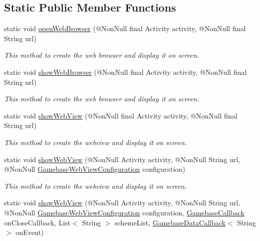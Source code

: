 \subsection*{Static Public Member Functions}
\begin{DoxyCompactItemize}
\item 
static void \hyperlink{classcom_1_1toast_1_1android_1_1gamebase_1_1_gamebase_1_1_web_view_a85a45ba53807b31382812cc72143122f}{open\+Web\+Browser} (@Non\+Null final Activity activity, @Non\+Null final String url)
\begin{DoxyCompactList}\small\item\em This method to create the web browser and display it on screen. \end{DoxyCompactList}\item 
static void \hyperlink{classcom_1_1toast_1_1android_1_1gamebase_1_1_gamebase_1_1_web_view_af42cb2004ff65ea216d3c3b26211ef34}{show\+Web\+Browser} (@Non\+Null final Activity activity, @Non\+Null final String url)
\begin{DoxyCompactList}\small\item\em This method to create the web browser and display it on screen. \end{DoxyCompactList}\item 
static void \hyperlink{classcom_1_1toast_1_1android_1_1gamebase_1_1_gamebase_1_1_web_view_ae3429d5340c6164295dc3ce3c3eb1b4c}{show\+Web\+View} (@Non\+Null final Activity activity, @Non\+Null final String url)
\begin{DoxyCompactList}\small\item\em This method to create the webview and display it on screen. \end{DoxyCompactList}\item 
static void \hyperlink{classcom_1_1toast_1_1android_1_1gamebase_1_1_gamebase_1_1_web_view_acb06909cde1d3338d7a7c852b9b76e76}{show\+Web\+View} (@Non\+Null Activity activity, @Non\+Null String url, @Non\+Null \hyperlink{classcom_1_1toast_1_1android_1_1gamebase_1_1_gamebase_web_view_configuration}{Gamebase\+Web\+View\+Configuration} configuration)
\begin{DoxyCompactList}\small\item\em This method to create the webview and display it on screen. \end{DoxyCompactList}\item 
static void \hyperlink{classcom_1_1toast_1_1android_1_1gamebase_1_1_gamebase_1_1_web_view_a6fb5730161a90d2f5d5d53efa80f84df}{show\+Web\+View} (@Non\+Null Activity activity, @Non\+Null String url, @Non\+Null \hyperlink{classcom_1_1toast_1_1android_1_1gamebase_1_1_gamebase_web_view_configuration}{Gamebase\+Web\+View\+Configuration} configuration, \hyperlink{interfacecom_1_1toast_1_1android_1_1gamebase_1_1_gamebase_callback}{Gamebase\+Callback} on\+Close\+Callback, List$<$ String $>$ scheme\+List, \hyperlink{interfacecom_1_1toast_1_1android_1_1gamebase_1_1_gamebase_data_callback}{Gamebase\+Data\+Callback}$<$ String $>$ on\+Event)

\end{DoxyCompactItemize}
